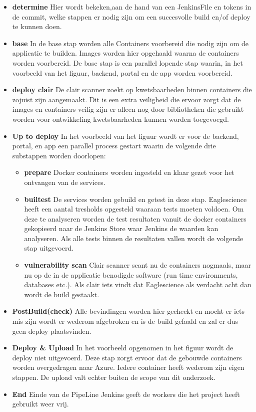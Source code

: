\begin{itemize}
    \item \textbf{determine} Hier wordt bekeken,aan de hand van een JenkinsFile en tokens in de commit, welke stappen er nodig zijn om een succesvolle build en/of deploy te kunnen doen.
    \item \textbf{base} In de base stap worden alle Containers voorbereid die nodig zijn om de applicatie te builden. Images worden hier opgehaald waarna de containers worden voorbereid. De base stap is een parallel lopende stap waarin, in het voorbeeld van het figuur, backend, portal en de app worden voorbereid.
    \item \textbf{deploy clair} De clair scanner zoekt op kwetsbaarheden binnen containers die zojuist zijn aangemaakt. Dit is een extra veiligheid die ervoor zorgt dat de images en containers veilig zijn er alleen nog door bibliotheken die gebruikt worden voor ontwikkeling kwetsbaarheden kunnen worden toegevoegd.
    \item \textbf{Up to deploy}
    In het voorbeeld van het figuur wordt er voor de backend, portal, en app een parallel process gestart waarin de volgende drie substappen worden doorlopen:
    \begin{itemize}
        \item \textbf{prepare} Docker containers worden ingesteld en klaar gezet voor het ontvangen van de services.
        \item \textbf{builtest} De services worden gebuild en getest in deze stap. Eaglescience heeft een aantal tresholds opgesteld waaraan tests moeten voldoen. Om deze te analyseren worden de test resultaten vanuit de docker containers gekopieerd naar de Jenkins Store waar Jenkins de waarden kan analyseren. Als alle tests binnen de resultaten vallen wordt de volgende stap uitgevoerd.
        \item \textbf{vulnerability scan} Clair scanner scant nu de containers nogmaals, maar nu op de in de applicatie benodigde software (run time environments, databases etc.). Als clair iets vindt dat Eaglescience als verdacht acht dan wordt de build gestaakt.
    \end{itemize}
    \item \textbf{PostBuild(check)}
    Alle bevindingen worden hier gecheckt en mocht er iets mis zijn wordt er wederom afgebroken en is de build gefaald en zal er dus geen deploy plaatsvinden.
    \item \textbf{Deploy \& Upload}
    In het voorbeeld opgenomen in het figuur wordt de deploy niet uitgevoerd. Deze stap zorgt ervoor dat de gebouwde containers worden overgedragen naar Azure. Iedere container heeft wederom zijn eigen stappen. De upload valt echter buiten de scope van dit onderzoek.
    \item \textbf{End}
    Einde van de PipeLine Jenkins geeft de workers die het project heeft gebruikt weer vrij.
\end{itemize}

